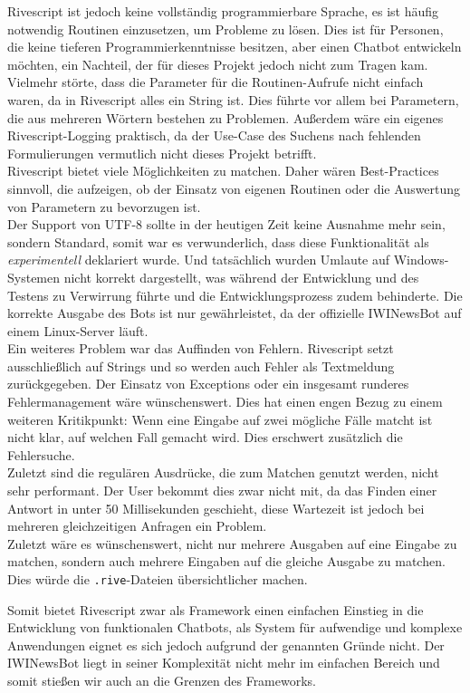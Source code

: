 Rivescript ist jedoch keine vollständig programmierbare Sprache, es ist häufig notwendig Routinen einzusetzen, um Probleme zu lösen. Dies ist für Personen, die keine tieferen Programmierkenntnisse besitzen, aber einen Chatbot entwickeln möchten, ein Nachteil, der für dieses Projekt jedoch nicht zum Tragen kam. Vielmehr störte, dass die Parameter für die Routinen-Aufrufe nicht einfach waren, da in Rivescript alles ein String ist. Dies führte vor allem bei Parametern, die aus mehreren Wörtern bestehen zu Problemen. Außerdem wäre ein eigenes Rivescript-Logging praktisch, da der Use-Case des Suchens nach fehlenden Formulierungen vermutlich nicht dieses Projekt betrifft. \\
Rivescript bietet viele Möglichkeiten zu matchen. Daher wären Best-Practices sinnvoll, die aufzeigen, ob der Einsatz von eigenen Routinen oder die Auswertung von Parametern zu bevorzugen ist.\\
Der Support von UTF-8 sollte in der heutigen Zeit keine Ausnahme mehr sein, sondern Standard, somit war es verwunderlich, dass diese Funktionalität als \emph{experimentell} deklariert wurde. Und tatsächlich wurden Umlaute auf Windows-Systemen nicht korrekt dargestellt, was während der Entwicklung und des Testens zu Verwirrung führte und die Entwicklungsprozess zudem behinderte. Die korrekte Ausgabe des Bots ist nur gewährleistet, da der offizielle IWINewsBot auf einem Linux-Server läuft. \\
Ein weiteres Problem war das Auffinden von Fehlern. Rivescript setzt ausschließlich auf Strings und so werden auch Fehler als Textmeldung zurückgegeben. Der Einsatz von Exceptions oder ein insgesamt runderes Fehlermanagement wäre wünschenswert. Dies hat einen engen Bezug zu einem weiteren Kritikpunkt: Wenn eine Eingabe auf zwei mögliche Fälle matcht ist nicht klar, auf welchen Fall gemacht wird. Dies erschwert zusätzlich die Fehlersuche.\\
Zuletzt sind die regulären Ausdrücke, die zum Matchen genutzt werden, nicht sehr performant. Der User bekommt dies zwar nicht mit, da das Finden einer Antwort in unter 50 Millisekunden geschieht, diese Wartezeit ist jedoch bei mehreren gleichzeitigen Anfragen ein Problem.\\
Zuletzt wäre es wünschenswert, nicht nur mehrere Ausgaben auf eine Eingabe zu matchen, sondern auch mehrere Eingaben auf die gleiche Ausgabe zu matchen. Dies würde die \texttt{.rive}-Dateien übersichtlicher machen.

Somit bietet Rivescript zwar als Framework einen einfachen Einstieg in die Entwicklung von funktionalen Chatbots, als System für aufwendige und komplexe Anwendungen eignet es sich jedoch aufgrund der genannten Gründe nicht. Der IWINewsBot liegt in seiner Komplexität nicht mehr im einfachen Bereich und somit stießen wir auch an die Grenzen des Frameworks.

